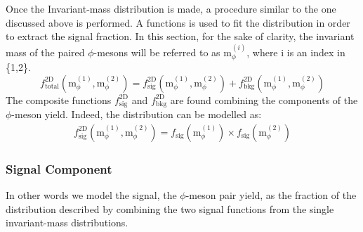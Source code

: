 \indent Once the Invariant-mass distribution is made, a procedure similar to the one discussed above is performed. A functions is used to fit the distribution in order to extract the signal fraction. In this section, for the sake of clarity, the invariant mass of the paired $\phi$-mesons will be referred to as m$_{\phi}^{(i)}$, where i is an index in \{1,2\}.\\
\begin{equation}
f^{\text{2D}}_{\text{total}}(\text{m}_{\phi}^{(1)},\text{m}_{\phi}^{(2)}) = f^{\text{2D}}_{\text{sig}}(\text{m}_{\phi}^{(1)},\text{m}_{\phi}^{(2)}) + f^{\text{2D}}_{\text{bkg}}(\text{m}_{\phi}^{(1)},\text{m}_{\phi}^{(2)}) 
\end{equation}
\indent The composite functions $ f^{\text{2D}}_{\text{sig}}$ and $ f^{\text{2D}}_{\text{bkg}}$ are found combining the components of the $\phi$-meson yield. Indeed, the distribution can be modelled as:
\begin{eqnarray}
 f^{\text{2D}}_{\text{sig}}(\text{m}_{\phi}^{(1)},\text{m}_{\phi}^{(2)}) =  f_{\text{sig}}(\text{m}_{\phi}^{(1)}) \times  f_{\text{sig}}(\text{m}_{\phi}^{(2)})
 \end{eqnarray}
\subsubsection{Signal Component} In other words we model the signal, the $\phi$-meson pair yield, as the fraction of the distribution described by combining the two signal functions from the single invariant-mass distributions.
